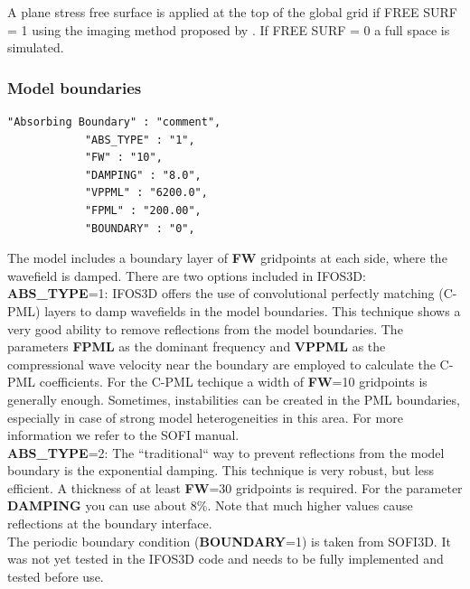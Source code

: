 A plane stress free surface is applied at the top of the global grid if FREE SURF = 1 using the imaging method proposed by \citep{Lev88}. If FREE SURF = 0 a full space is simulated.
\subsubsection*{Model boundaries}
\begin{verbatim}
"Absorbing Boundary" : "comment",
			"ABS_TYPE" : "1",			
			"FW" : "10",
			"DAMPING" : "8.0",
			"VPPML" : "6200.0",
			"FPML" : "200.00",
			"BOUNDARY" : "0",
\end{verbatim}

The model includes a boundary layer of \textbf{FW} gridpoints at each side, where the wavefield is damped. There are two options included in IFOS3D:\\
\textbf{ABS\_TYPE}=1: IFOS3D offers the use of convolutional perfectly matching (C-PML) layers to damp wavefields in the model boundaries. This technique shows a very good ability to remove reflections from the model boundaries. The parameters \textbf{FPML} as the dominant frequency and \textbf{VPPML} as the compressional wave velocity near the boundary are employed to calculate the C-PML coefficients. For the C-PML techique a width of \textbf{FW}=10 gridpoints is generally enough. Sometimes, instabilities can be created in the PML boundaries, especially in case of strong model heterogeneities in this area. For more information we refer to the SOFI manual.\\
\textbf{ABS\_TYPE}=2: The ``traditional`` way to prevent reflections from the model boundary is the exponential damping. This technique is very robust, but less efficient. A thickness of at least \textbf{FW}=30 gridpoints is required. For the parameter \textbf{DAMPING} you can use about 8\%. Note that much higher values cause reflections at the boundary interface.\\
The periodic boundary condition (\textbf{BOUNDARY}=1) is taken from SOFI3D. It was not yet tested in the IFOS3D code and needs to be fully implemented and tested before use.

